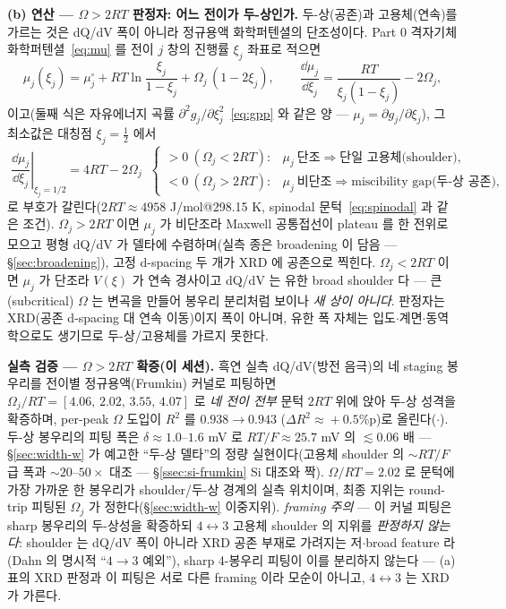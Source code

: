 \textbf{(b) 연산 --- $\Omega>2RT$ 판정자: 어느 전이가 두-상인가.}
두-상(공존)과 고용체(연속)를 가르는 것은 dQ/dV 폭이 아니라 정규용액 화학퍼텐셜의 단조성이다.
Part 0 격자기체 화학퍼텐셜~\eqref{eq:mu} 를 전이 $j$ 창의 진행률 $\xi_j$ 좌표로 적으면
\begin{equation}
\mu_j(\xi_j)=\mu_j^{\circ}+RT\ln\frac{\xi_j}{1-\xi_j}+\Omega_j\,(1-2\xi_j),
\qquad
\frac{\dd\mu_j}{\dd\xi_j}=\frac{RT}{\xi_j(1-\xi_j)}-2\Omega_j,
\label{eq:gr2l-mu}
\end{equation}
이고(둘째 식은 자유에너지 곡률 $\partial^2 g_j/\partial\xi_j^2$~\eqref{eq:gpp} 와 같은 양 --- $\mu_j=\partial
g_j/\partial\xi_j$), 그 최소값은 대칭점 $\xi_j=\tfrac12$ 에서
\begin{equation}
\boxed{\;\left.\frac{\dd\mu_j}{\dd\xi_j}\right|_{\xi_j=1/2}=4RT-2\Omega_j
\;\;\begin{cases}>0\ (\Omega_j<2RT):&\mu_j\ \text{단조}\Rightarrow\text{단일 고용체(shoulder)},\\[2pt]
<0\ (\Omega_j>2RT):&\mu_j\ \text{비단조}\Rightarrow\text{miscibility gap(두-상 공존)},\end{cases}\;}
\label{eq:gr2l-judge}
\end{equation}
로 부호가 갈린다($2RT\approx4958$ J/mol@298.15 K, spinodal 문턱~\eqref{eq:spinodal} 과 같은 조건).
$\Omega_j>2RT$ 이면 $\mu_j$ 가 비단조라 Maxwell 공통접선이 plateau 를 한 전위로 모으고 평형 dQ/dV 가
델타에 수렴하며(실측 종은 broadening 이 담음 --- \S\ref{sec:broadening}), 고정 d-spacing 두 개가 XRD 에
공존으로 찍힌다. $\Omega_j<2RT$ 이면 $\mu_j$ 가 단조라 $V(\xi)$ 가 연속 경사이고 dQ/dV 는 유한 broad
shoulder 다 --- 큰(subcritical) $\Omega$ 는 변곡을 만들어 봉우리 분리처럼 보이나 \emph{새 상이 아니다}.
판정자는 XRD(공존 d-spacing 대 연속 이동)이지 폭이 아니며, 유한 폭 자체는 입도$\cdot$계면$\cdot$동역학으로도
생기므로 두-상/고용체를 가르지 못한다.

\begin{verifybox}
\textbf{실측 검증 --- $\Omega>2RT$ 확증(이 세션).} 흑연 실측 dQ/dV(방전 음극)의 네 staging 봉우리를 전이별
정규용액(Frumkin) 커널로 피팅하면 $\Omega_j/RT=[4.06,\,2.02,\,3.55,\,4.07]$ 로 \emph{네 전이 전부} 문턱
$2RT$ 위에 앉아 두-상 성격을 확증하며, per-peak $\Omega$ 도입이 $R^2$ 를 $0.938\!\to\!0.943$
($\Delta R^2\!\approx\!+0.5$\%p)로 올린다($\cdot$). 두-상 봉우리의
피팅 폭은 $\delta\!\approx\!1.0$--$1.6$ mV 로 $RT/F\!\approx\!25.7$ mV 의 $\lesssim\!0.06$ 배 --- \S\ref{sec:width-w}
가 예고한 ``두-상 델타''의 정량 실현이다(고용체 shoulder 의 $\sim RT/F$ 급 폭과 $\sim20$--$50\times$ 대조 ---
\S\ref{ssec:si-frumkin} Si 대조와 짝). $\Omega/RT\!=\!2.02$ 로 문턱에 가장 가까운 한 봉우리가 shoulder/두-상
경계의 실측 위치이며, 최종 지위는 round-trip 피팅된 $\Omega_j$ 가 정한다(\S\ref{sec:width-w} 이중지위).
\emph{framing 주의} --- 이 커널 피팅은 sharp 봉우리의 두-상성을 확증하되 $4\!\leftrightarrow\!3$ 고용체
shoulder 의 지위를 \emph{판정하지 않는다}: shoulder 는 dQ/dV 폭이 아니라 XRD 공존 부재로 가려지는
저$\cdot$broad feature 라(Dahn 의 명시적 ``$4\!\to\!3$ 예외''), sharp 4-봉우리 피팅이 이를 분리하지 않는다
--- (a) 표의 XRD 판정과 이 피팅은 서로 다른 framing 이라 모순이 아니고, $4\!\leftrightarrow\!3$ 는 XRD 가
가른다.
\end{verifybox}

